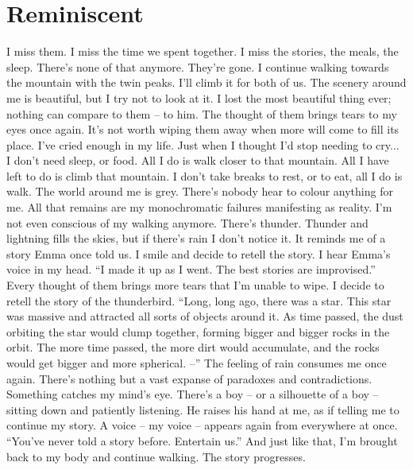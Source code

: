 \documentclass[openany, 12pt]{book}
\newcommand\tab[1][1cm]{\hspace*{#1}}
\begin{document}
\chapter{Reminiscent}
\tab
I miss them. I miss the time we spent together. I miss the stories, the meals, the sleep. There’s none of that anymore. They’re gone. I continue walking towards the mountain with the twin peaks. I’ll climb it for both of us. The scenery around me is beautiful, but I try not to look at it. I lost the most beautiful thing ever; nothing can compare to them -- to him. The thought of them brings tears to my eyes once again. It’s not worth wiping them away when more will come to fill its place. I’ve cried enough in my life. Just when I thought I’d stop needing to cry...
\newline
\tab
I don’t need sleep, or food. All I do is walk closer to that mountain. All I have left to do is climb that mountain. I don’t take breaks to rest, or to eat, all I do is walk. The world around me is grey. There’s nobody hear to colour anything for me. All that remains are my monochromatic failures manifesting as reality. I’m not even conscious of my walking anymore. There’s thunder.
\newline
\tab
Thunder and lightning fills the skies, but if there’s rain I don’t notice it. It reminds me of a story Emma once told us. I smile and decide to retell the story. I hear Emma’s voice in my head. ``I made it up as I went. The best stories are improvised.'' Every thought of them brings more tears that I’m unable to wipe. I decide to retell the story of the thunderbird.
\newline
\tab
``Long, long ago, there was a star. This star was massive and attracted all sorts of objects around it. As time passed, the dust orbiting the star would clump together, forming bigger and bigger rocks in the orbit. The more time passed, the more dirt would accumulate, and the rocks would get bigger and more spherical. --''
\newline
\tab
The feeling of rain consumes me once again. There’s nothing but a vast expanse of paradoxes and contradictions. Something catches my mind’s eye. There’s a boy -- or a silhouette of a boy -- sitting down and patiently listening. He raises his hand at me, as if telling me to continue my story. A voice -- my voice -- appears again from everywhere at once. ``You’ve never told a story before. Entertain us.'' And just like that, I’m brought back to my body and continue walking. The story progresses.
\newline
\end{document}
